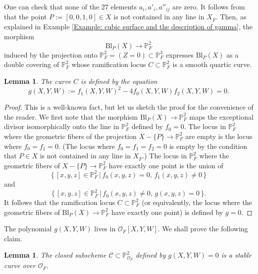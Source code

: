 \documentclass{amsart}
\newtheorem{lem}[prop]{Lemma}
\theoremstyle{definition}
\theoremstyle{remark}
\newcommand{\PP}{\mathbb P}
\begin{document}
One can check that none of the $27$ elements $a_i, a'_i, a''_{ij}$ are zero.
It follows from \cite[Theorem 15]{Shioda} that the point
$P:=[0, 0, 1, 0] \in X$ is not contained in any line in $X_{\overline{F}}$.
Then, as explained in Example \ref{Example: cubic surface and the description of gamma},
the morphism
\[
\mathrm{Bl}_P (X) \to \PP^2_{F}
\]
induced by the projection onto $\PP^2_{F} = (Z=0) \subset \PP^3_{F}$
expresses $\mathrm{Bl}_P (X)$ as a double covering of $\PP^2_{F}$ whose ramification locus $C \subset \PP^2_{F}$ is a smooth quartic curve.

\begin{lem}\label{Lemma:defining equation of ramified locus}
The curve
$C$ is defined by the equation
\[
g(X, Y, W):=f_1(X, Y, W)^2-4f_0(X, Y, W)f_2(X, Y, W)=0.
\]
\end{lem}

\begin{proof}
This is a well-known fact, but let us sketch the proof for the convenience of the reader.
We first note that the morphism
$\mathrm{Bl}_P (X) \to \PP^2_{F}$ maps the exceptional divisor isomorphically onto the line in $\PP^2_{F}$ defined by $f_0=0$.
The locus in $\PP^2_{F}$ where the geometric fibers of the projection $X - \{ P \} \to \PP^2_{F}$ are empty is the locus where $f_0=f_1=0$.
(The locus where $f_0=f_1=f_2=0$ is empty by the condition that $P \in X$ is not contained in any line in $X_{\overline{F}}$.)
The locus in $\PP^2_{F}$ where the geometric fibers of $X - \{ P \} \to \PP^2_{F}$ have exactly one point is the union of 
\[
\{ \, [x, y, z] \in \PP^2_{F} \, \vert \, f_0(x, y, z)=0, \, f_1(x, y, z) \neq 0 \, \}
\]
and
\[
\{ \, [x, y, z] \in \PP^2_{F} \, \vert \, f_0(x, y, z) \neq 0, \, g(x, y, z) = 0 \, \}.
\]
It follows that the ramification locus $C \subset \PP^2_{F}$ (or equivalently, the locus where the geometric fibers of
$\mathrm{Bl}_P (X) \to \PP^2_{F}$
have exactly one point) is defined by $g=0$.
\end{proof}

The polynomial $g(X, Y, W)$ lives in $\mathcal{O}_F[X, Y, W]$.
We shall prove the following claim.

\begin{lem}\label{lem: ramified locus has stable reduction}
    The closed subscheme
$\mathscr{C} \subset \PP^2_{\mathcal{O}_F}$
defined by $g(X, Y, W)=0$ is a stable curve over $\mathcal{O}_F$.
\end{lem}
\end{document}
